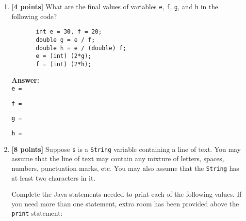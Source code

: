 \documentclass[11pt]{report}
\begin{document}
\begin{enumerate}




















\newpage

\item {\bf [4 points]}
What are the final values of variables {\tt e}, {\tt f}, {\tt g}, and
{\tt h} in the following code?
\begin{verbatim}
       int e = 30, f = 20;
       double g = e / f;
       double h = e / (double) f;
       e = (int) (2*g);
       f = (int) (2*h);
\end{verbatim}
{\bf Answer:}\\
\verb$e = $\underline{\hspace{.5in}}

\bigskip
\verb$f = $\underline{\hspace{.5in}}

\bigskip
\verb$g = $\underline{\hspace{.5in}}

\bigskip
\verb$h = $\underline{\hspace{.5in}}

\bigskip \item {\bf [8 points]} Suppose {\tt s} is a {\tt String} variable containing a line of text.  You may assume
that the line of text may contain any mixture of letters, spaces, numbers, punctuation marks, etc. You may also assume
that the {\tt String} has at least two characters in it.

Complete the Java statements needed to print each of the following values. If you need more than one statement, extra
room has been provided above the {\tt print} statement:


\end{enumerate}
\end{document}
